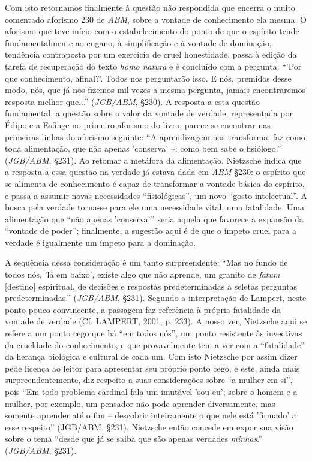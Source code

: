 \documentclass[
	12pt,				%
	openright,			%
	oneside,			%
	a4paper,			%
	english,			%
	french,				%
	spanish,			%
	brazil				%
	]{abntex2}
\begin{document}
Com isto retornamos finalmente à questão não respondida que encerra o muito comentado aforismo 230 de \textit{ABM}, sobre a vontade de conhecimento ela mesma. O aforismo que teve início com o estabelecimento do ponto de que o espírito tende fundamentalmente ao engano, à simplificação e à vontade de dominação, tendência contraposta por um exercício de cruel  honestidade, passa à edição da tarefa de recuperação do texto \textit{homo natura} e é concluído com a pergunta: “'Por que conhecimento, afinal?'. Todos nos perguntarão isso. E nós, premidos desse modo, nós, que já nos fizemos mil vezes a mesma pergunta, jamais encontraremos resposta melhor que...” (\textit{JGB/ABM}, §230). A resposta a esta questão fundamental, a questão sobre o valor da vontade de verdade, representada por Édipo e a Esfinge no primeiro aforismo do livro, parece se encontrar nas primeiras linhas do aforismo seguinte: “A aprendizagem nos transforma; faz como toda alimentação, que não apenas 'conserva' –: como bem sabe o fisiólogo.” (\textit{JGB/ABM}, §231). Ao retomar a metáfora da alimentação, Nietzsche indica que a resposta a essa questão na verdade já estava dada em \textit{ABM} §230: o espírito que se alimenta de conhecimento é capaz de transformar a vontade básica do espírito, e passa a assumir novas necessidades “fisiológicas”, um novo “gosto intelectual”. A busca pela verdade torna-se para ele uma necessidade vital, uma fatalidade. Uma alimentação que “não apenas 'conserva'” seria aquela que favorece a expansão da “vontade de poder”; finalmente, a sugestão aqui é de que o ímpeto cruel para a verdade é igualmente um ímpeto para a dominação.

	A sequência dessa consideração é um tanto surpreendente: “Mas no fundo de todos nós, 'lá em baixo', existe algo que não aprende, um granito de \textit{fatum} [destino] espiritual, de decisões e respostas predeterminadas a seletas perguntas predeterminadas.” (\textit{JGB/ABM}, §231). Segundo a interpretação de Lampert, neste ponto pouco convincente, a passagem faz referência à própria fatalidade da vontade de verdade (Cf. LAMPERT, 2001, p. 233). A nosso ver, Nietzsche aqui se refere a um ponto cego que há “em todos nós”, um ponto resistente às invectivas da crueldade do conhecimento, e que provavelmente tem a ver com a “fatalidade” da herança biológica e cultural de cada um. Com isto Nietzsche por assim dizer pede licença ao leitor para apresentar seu próprio ponto cego, e este, ainda mais surpreendentemente, diz respeito a suas considerações sobre “a mulher em si”, pois “Em todo problema cardinal fala um imutável 'sou eu'; sobre o homem e a mulher, por exemplo, um pensador não pode aprender diversamente, mas somente aprender até o fim – descobrir inteiramente o que nele está 'firmado' a esse respeito” (JGB/ABM, §231). Nietzsche então concede em expor sua visão sobre o tema “desde que já se saiba que são apenas verdades \textit{minhas}.” (\textit{JGB/ABM}, §231).
\end{document}
